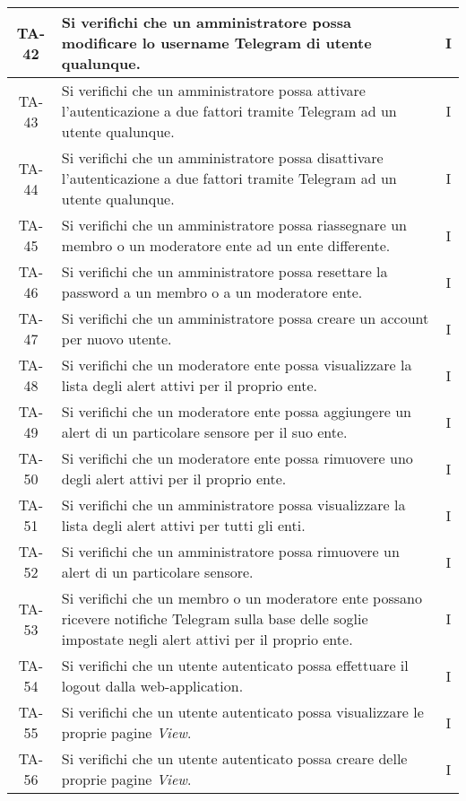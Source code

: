 \begin{center}
\begin{longtable}{|c|p{10cm}|c|}
			 \hline
			 TA-42 & Si verifichi che un amministratore possa modificare lo username Telegram di utente qualunque. & I \\
			 \hline
			 TA-43 & Si verifichi che un amministratore possa attivare l'autenticazione a due fattori tramite Telegram ad un utente qualunque. & I \\
			 \hline
			 TA-44 & Si verifichi che un amministratore possa disattivare l'autenticazione a due fattori tramite Telegram ad un utente qualunque. & I \\
			 \hline
			 TA-45 & Si verifichi che un amministratore possa riassegnare un membro o un moderatore ente ad un ente differente. & I \\
			 \hline
			 TA-46 & Si verifichi che un amministratore possa resettare la password a un membro o a un moderatore ente. & I \\
			 \hline
			 TA-47 & Si verifichi che un amministratore possa creare un account per nuovo utente. & I \\
			 \hline
			 TA-48 & Si verifichi che un moderatore ente possa visualizzare la lista degli alert attivi per il proprio ente. & I \\
			 \hline
			 TA-49 & Si verifichi che un moderatore ente possa aggiungere un alert di un particolare sensore per il suo ente. & I \\
			 \hline
			 TA-50 & Si verifichi che un moderatore ente possa rimuovere uno degli alert attivi per il proprio ente. & I \\
			 \hline
			 TA-51 & Si verifichi che un amministratore possa visualizzare la lista degli alert attivi per tutti gli enti. & I \\
			 \hline
			 TA-52 & Si verifichi che un amministratore possa rimuovere un alert di un particolare sensore. & I \\
			 \hline
			 TA-53 & Si verifichi che un membro o un moderatore ente possano ricevere notifiche Telegram sulla base delle soglie impostate negli alert attivi per il proprio ente. & I \\
			 \hline
			 TA-54 & Si verifichi che un utente autenticato possa effettuare il logout dalla web-application. & I \\
			 \hline
			 TA-55 & Si verifichi che un utente autenticato possa visualizzare le proprie pagine \textit{View}. & I \\
			 \hline
			 TA-56 & Si verifichi che un utente autenticato possa creare delle proprie pagine \textit{View}. & I \\
			 \hline

\end{longtable}
\end{center}
